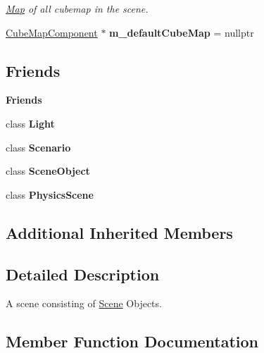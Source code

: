 \begin{Indent}
\begin{DoxyCompactItemize}
\begin{DoxyCompactList}\small\item\em \mbox{\hyperlink{classrev_1_1_map}{Map}} of all cubemap in the scene. \end{DoxyCompactList}\item 
\mbox{\label{classrev_1_1_scene_a81545f9f87efa17f20d9750782b702ef}} 
\mbox{\hyperlink{classrev_1_1_cube_map_component}{Cube\+Map\+Component}} $\ast$ {\bfseries m\+\_\+default\+Cube\+Map} = nullptr
\end{DoxyCompactItemize}
\end{Indent}
\subsection*{Friends}
\begin{Indent}\textbf{ Friends}\par
\begin{DoxyCompactItemize}
\item 
\mbox{\label{classrev_1_1_scene_a27862a9fe512b352f98ec1c054680edd}} 
class {\bfseries Light}
\item 
\mbox{\label{classrev_1_1_scene_a8aa97ba078be6635ba5a8b6c7a3b66a4}} 
class {\bfseries Scenario}
\item 
\mbox{\label{classrev_1_1_scene_a737b3cb474f324a74e7da2d3aeca10c9}} 
class {\bfseries Scene\+Object}
\item 
\mbox{\label{classrev_1_1_scene_abd93146f051659465d62718a985e4171}} 
class {\bfseries Physics\+Scene}
\end{DoxyCompactItemize}
\end{Indent}
\subsection*{Additional Inherited Members}


\subsection{Detailed Description}
A scene consisting of \mbox{\hyperlink{classrev_1_1_scene}{Scene}} Objects. 

\subsection{Member Function Documentation}
\mbox{\label{classrev_1_1_scene_a1d6dd18469c4b598dcc51f4a006f22ee}} 
